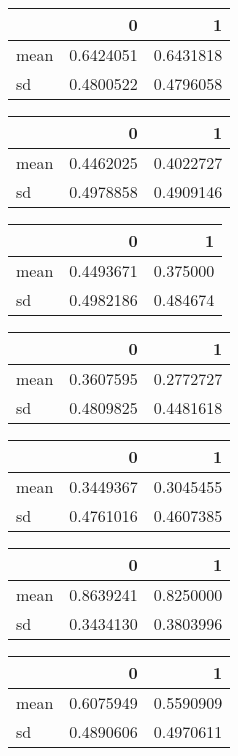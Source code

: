 \documentclass[]{article}
\begin{document}
\begin{table}[H]
\begin{tabular}[t]{lrr}
\bottomrule
\end{tabular}
\centering
\begin{tabular}[t]{lrr}
\toprule
  & 0 & 1\\
\midrule
mean & 0.6424051 & 0.6431818\\
sd & 0.4800522 & 0.4796058\\
\bottomrule
\end{tabular}
\centering
\begin{tabular}[t]{lrr}
\toprule
  & 0 & 1\\
\midrule
mean & 0.4462025 & 0.4022727\\
sd & 0.4978858 & 0.4909146\\
\bottomrule
\end{tabular}
\centering
\begin{tabular}[t]{lrr}
\toprule
  & 0 & 1\\
\midrule
mean & 0.4493671 & 0.375000\\
sd & 0.4982186 & 0.484674\\
\bottomrule
\end{tabular}
\centering
\begin{tabular}[t]{lrr}
\toprule
  & 0 & 1\\
\midrule
mean & 0.3607595 & 0.2772727\\
sd & 0.4809825 & 0.4481618\\
\bottomrule
\end{tabular}
\centering
\begin{tabular}[t]{lrr}
\toprule
  & 0 & 1\\
\midrule
mean & 0.3449367 & 0.3045455\\
sd & 0.4761016 & 0.4607385\\
\bottomrule
\end{tabular}
\centering
\begin{tabular}[t]{lrr}
\toprule
  & 0 & 1\\
\midrule
mean & 0.8639241 & 0.8250000\\
sd & 0.3434130 & 0.3803996\\
\bottomrule
\end{tabular}
\centering
\begin{tabular}[t]{lrr}
\toprule
  & 0 & 1\\
\midrule
mean & 0.6075949 & 0.5590909\\
sd & 0.4890606 & 0.4970611\\
\bottomrule
\end{tabular}
\centering
\begin{tabular}[t]{lrr}
\toprule

\end{tabular}
\end{table}
\end{document}
